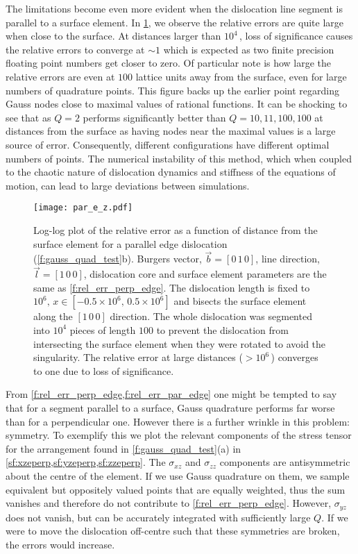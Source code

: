 The limitations become even more evident when the dislocation line segment is parallel to a surface element. In \cref{f:rel_err_par_edge}, we observe the relative errors are quite large when close to the surface. At distances larger than $10^4\, $, loss of significance causes the relative errors to converge at $\sim 1$ which is expected as two finite precision floating point numbers get closer to zero. Of particular note is how large the relative errors are even at $100$ lattice units away from the surface, even for large numbers of quadrature points. This figure backs up the earlier point regarding Gauss nodes close to maximal values of rational functions. It can be shocking to see that as $Q = 2$ performs significantly better than $Q = 10, 11, 100, 100$ at distances from the surface as having nodes near the maximal values is a large source of error. Consequently, different configurations have different optimal numbers of points. The numerical instability of this method, which when coupled to the chaotic nature of dislocation dynamics and stiffness of the equations of motion, can lead to large deviations between simulations.
\begin{figure}
    \centering
    \texttt{[image: par\_e\_z.pdf]}
    \caption[Relative error for an edge dislocation parallel to a surface element.]{Log-log plot of the relative error as a function of distance from the surface element for a parallel edge dislocation (\cref{f:gauss_quad_test}b). Burgers vector, $\vec{b} = [0\, 1\, 0]$, line direction, $\vec{l} = [1\, 0\, 0]$, dislocation core and surface element parameters are the same as \cref{f:rel_err_perp_edge}. The dislocation length is fixed to $10^{6},\, x\in\left[-0.5\times10^{6},\, 0.5\times10^{6} \right]$ and bisects the surface element along the $[1\, 0\, 0]$ direction. The whole dislocation was segmented into $10^4$ pieces of length $100$ to prevent the dislocation from intersecting the surface element when they were rotated to avoid the singularity. The relative error at large distances ($>10^6\, $) converges to one due to loss of significance.}
    \label{f:rel_err_par_edge}
\end{figure}

From \cref{f:rel_err_perp_edge,f:rel_err_par_edge} one might be tempted to say that for a segment parallel to a surface, Gauss quadrature performs far worse than for a perpendicular one. However there is a further wrinkle in this problem: symmetry. To exemplify this we plot the relevant components of the stress tensor for the arrangement found in \cref{f:gauss_quad_test}(a) in \cref{sf:xzeperp,sf:yzeperp,sf:zzeperp}. The $\sigma_{xz}$ and $\sigma_{zz}$ components are antisymmetric about the centre of the element. If we use Gauss quadrature on them, we sample equivalent but oppositely valued points that are equally weighted, thus the sum vanishes and therefore do not contribute to \cref{f:rel_err_perp_edge}. However, $\sigma_{yz}$ does not vanish, but can be accurately integrated with sufficiently large $Q$. If we were to move the dislocation off-centre such that these symmetries are broken, the errors would increase.

